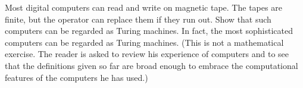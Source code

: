 Most digital computers can read and write on magnetic tape. The tapes are finite, but the operator can replace them if they run out. Show that such computers can be regarded as Turing machines. In fact, the most sophisticated computers can be regarded as Turing machines. (This is not a mathematical exercise. The reader is asked to review his experience of computers and to see that the definitions given so far are broad enough to embrace the computational features of the computers he has used.)
